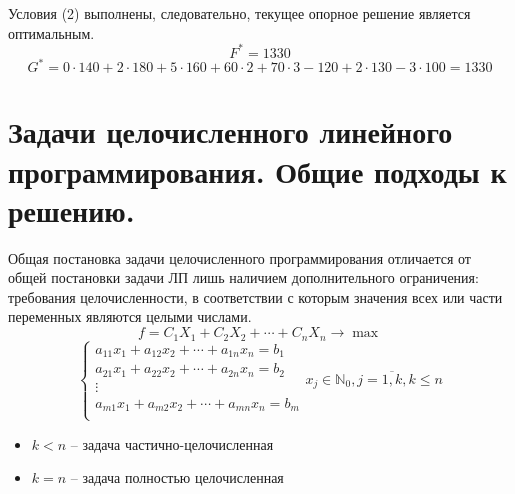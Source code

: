 \documentclass[17pt]{extarticle}
\begin{document}
Условия (2) выполнены, следовательно, текущее опорное решение является оптимальным.
\[
    F^* = 1330
\]
\[
    G^* = 0 \cdot 140 + 2 \cdot 180 + 5 \cdot 160 + 60 \cdot 2 + 70 \cdot 3 - 120 + 2 \cdot 130 - 3 \cdot 100 = 1330
\]


\section{Задачи целочисленного линейного программирования. Общие подходы к решению.}
Общая постановка задачи целочисленного
программирования отличается от общей
постановки задачи ЛП лишь наличием
дополнительного ограничения: требования
целочисленности, в соответствии с которым
значения всех или части переменных
являются целыми числами.
\[
    f = C_1 X_1 + C_2 X_2 + \cdots + C_n X_n \rightarrow \max
\]
\[
    \begin{cases}
        a_{11}x_1 + a_{12}x_2 + \cdots + a_{1n}x_n = b_1 \\
        a_{21}x_1 + a_{22}x_2 + \cdots + a_{2n}x_n = b_2 \\
        \vdots                                           \\
        a_{m1}x_1 + a_{m2}x_2 + \cdots + a_{mn}x_n = b_m \\
    \end{cases} x_j \in \mathbb{N}_0, j=\overline{1,k}, k \leq n
\]
\begin{itemize}
    \item $k<n$ -- задача частично-целочисленная
    \item $k=n$ -- задача полностью целочисленная
\end{itemize}
\end{document}
